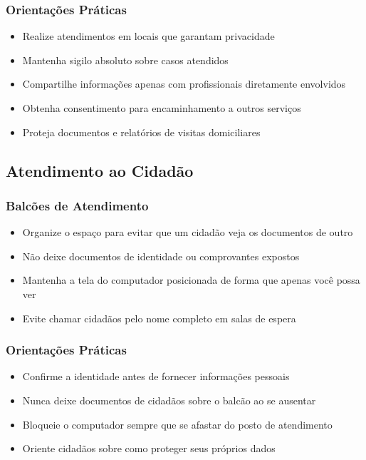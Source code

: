 \documentclass[12pt,a4paper]{article}
\begin{document}
\subsubsection{Orientações Práticas}
\begin{itemize}
    \item Realize atendimentos em locais que garantam privacidade
    \item Mantenha sigilo absoluto sobre casos atendidos
    \item Compartilhe informações apenas com profissionais diretamente envolvidos
    \item Obtenha consentimento para encaminhamento a outros serviços
    \item Proteja documentos e relatórios de visitas domiciliares
\end{itemize}

\subsection{Atendimento ao Cidadão}

\subsubsection{Balcões de Atendimento}
\begin{itemize}
    \item Organize o espaço para evitar que um cidadão veja os documentos de outro
    \item Não deixe documentos de identidade ou comprovantes expostos
    \item Mantenha a tela do computador posicionada de forma que apenas você possa ver
    \item Evite chamar cidadãos pelo nome completo em salas de espera
\end{itemize}

\subsubsection{Orientações Práticas}
\begin{itemize}
    \item Confirme a identidade antes de fornecer informações pessoais
    \item Nunca deixe documentos de cidadãos sobre o balcão ao se ausentar
    \item Bloqueie o computador sempre que se afastar do posto de atendimento
    \item Oriente cidadãos sobre como proteger seus próprios dados
\end{itemize}
\end{document}
